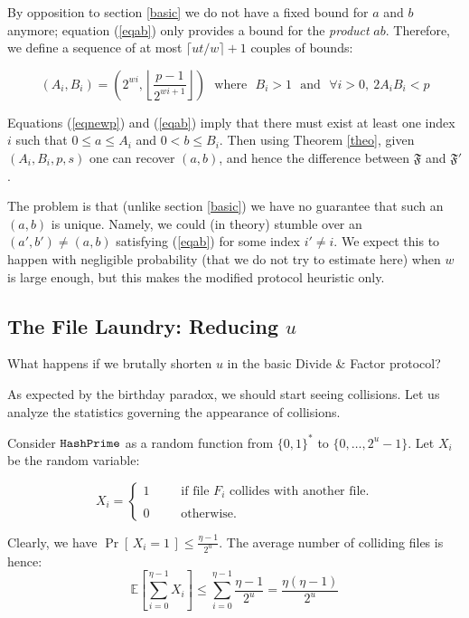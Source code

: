 \documentclass[11pt]{llncs}
\newcommand{\Prob}[1]{{\Pr\left[\,{#1}\,\right]}}
\newcommand{\EE}[1]{{\mathbb{E}\left[{#1}\right]}}
\begin{document}
By opposition to section \ref{basic} we do not have a fixed bound for $a$ and $b$ anymore; equation (\ref{eqab}) only provides a bound for the {\sl product} $a b$. Therefore, we define a sequence of at most $\lceil ut/w \rceil+1$ couples of bounds:

$$\left(A_i,B_i\right)=\left(2^{wi},\left\lfloor \frac{p-1}{2^{wi+1}} \right\rfloor\right)\mbox{~~where~~}B_i>1\mbox{~~and~~}\forall i>0,~2 A_i B_i<p$$

Equations (\ref{eqnewp}) and (\ref{eqab}) imply that there must exist at least one index $i$ such that $0 \leq a \leq A_i$ and $0 <b \leq B_i$. Then using Theorem \ref{theo}, given $(A_i,B_i,p,s)$ one can recover $(a,b)$, and hence the difference between $\mathfrak{F}$ and $\mathfrak{F}'$.\smallskip

The problem is that (unlike section \ref{basic}) we have no guarantee that such an $(a,b)$ is unique. Namely, we could (in theory) stumble over an $(a',b')\neq (a,b)$ satisfying (\ref{eqab}) for some index $i' \neq i$. We expect this to happen with negligible probability (that we do not try to estimate here) when $w$ is large enough, but this makes the modified protocol heuristic only.\smallskip

\subsection{The File Laundry: Reducing $u$}

What happens if we brutally shorten $u$ in the basic Divide \& Factor protocol?\smallskip

As expected by the birthday paradox, we should start seeing collisions. Let us analyze the statistics governing the appearance of collisions.

Consider $\mbox{{\tt HashPrime}}$ as a random function from $\{0,1\}^*$ to $\{0,\dots,2^u-1\}$. Let $X_i$ be the random variable:

$$
X_i =
\left\{
\begin{array}{lcl}
1 & ~~~~&  \mbox{if file $F_i$ collides with another file.}\\
\\
0 & ~~~~&  \mbox{otherwise.}
\end{array}
\right.
$$

Clearly, we have $\Prob{X_i = 1} \le \frac{\eta -1}{2^u}$.
The average number of colliding files is hence:
\[ \EE{\sum_{i=0}^{\eta-1} X_i} \le \sum_{i=0}^{\eta-1} \frac{\eta -1}{2^u} = \frac{\eta (\eta - 1)}{2^u} \]
\end{document}
